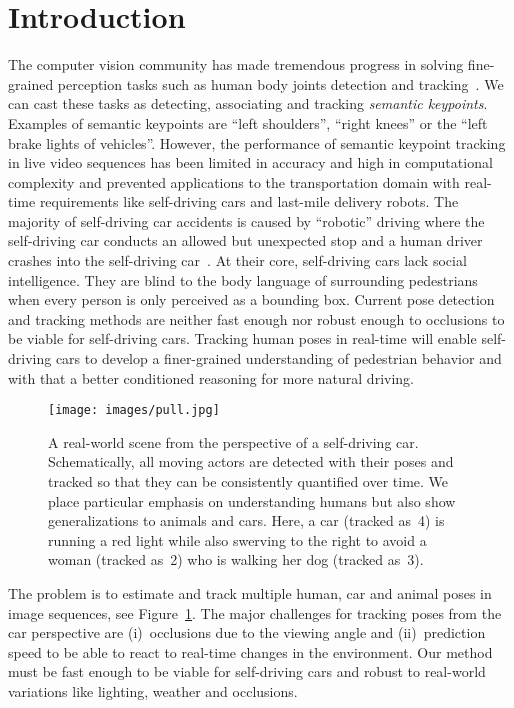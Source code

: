 \documentclass[journal]{IEEEtran}
\begin{document}
\IEEEpeerreviewmaketitle



\section{Introduction}

The computer vision community has made tremendous progress in solving fine-grained perception tasks such as human body joints detection and tracking~\cite{andriluka14cvpr,lin2014microsoft}. We can cast these tasks as detecting, associating and tracking \textit{semantic keypoints}. Examples of semantic keypoints are ``left shoulders'', ``right knees'' or the ``left brake lights of vehicles''.
However, the performance of semantic keypoint tracking in live video sequences has been limited in accuracy and high in computational complexity
and prevented applications to the transportation domain with real-time requirements like self-driving cars
and last-mile delivery robots.
The majority of self-driving car accidents is caused by ``robotic'' driving where
the self-driving car conducts an allowed but unexpected stop and a human driver crashes
into the self-driving car~\cite{crow2017howsafeareselfdrivingcars}.
At their core, self-driving cars lack social intelligence.
They are blind to the body language of surrounding pedestrians when every person is
only perceived as a bounding box.
Current pose detection and tracking methods are neither fast enough nor robust enough to occlusions to be viable for self-driving cars.
Tracking human poses in real-time will enable
self-driving cars to develop a finer-grained understanding of pedestrian behavior
and with that a better conditioned reasoning for more natural driving.

\begin{figure}[t]
  \centering
  \texttt{[image: images/pull.jpg]}
  \caption{
    A real-world scene from the perspective of a self-driving car. Schematically, all moving
    actors are detected with their poses and tracked so that they can
    be consistently quantified over time. We place particular emphasis on
    understanding humans but also show generalizations to animals and cars.
    Here, a car (tracked as~4) is running a red light while also swerving to
    the right to avoid a woman (tracked as~2) who is walking her
    dog (tracked as~3).
}
  \label{fig:pull}
\end{figure}

The problem is to estimate and track multiple human, car and animal poses in
image sequences, see Figure~\ref{fig:pull}.
The major challenges for tracking poses from the car perspective are
(i)~occlusions due to the viewing angle and
(ii)~prediction speed to be able to react to real-time changes in the environment.
Our method must be fast enough to be viable for
self-driving cars and robust to real-world variations like lighting, weather
and occlusions.
\end{document}
